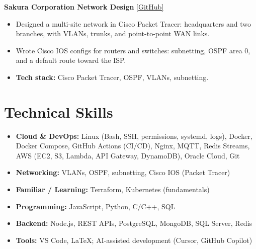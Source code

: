 \documentclass[a4paper,10.5pt]{article}
\begin{document}
\vspace{0.08cm}

\textbf{Sakura Corporation Network Design} \hfill
{\small \href{https://github.com/Muhammad-Ahmad17/sakura-corporation-network-design}{[GitHub]}}
\begin{itemize}[nosep, leftmargin=1.5em, topsep=2pt]
  \item Designed a multi-site network in Cisco Packet Tracer: headquarters and two branches, with VLANs, trunks, and point-to-point WAN links.
  \item Wrote Cisco IOS configs for routers and switches: subnetting, OSPF area 0, and a default route toward the ISP.
  \item \textbf{Tech stack:} Cisco Packet Tracer, OSPF, VLANs, subnetting.
\end{itemize}

\section{Technical Skills}

\begin{itemize}[nosep, leftmargin=1.5em, topsep=2pt]
  \item \textbf{Cloud \& DevOps:} Linux (Bash, SSH, permissions, systemd, logs), Docker, Docker Compose, GitHub Actions (CI/CD), Nginx, MQTT, Redis Streams, AWS (EC2, S3, Lambda, API Gateway, DynamoDB), Oracle Cloud, Git
  \item \textbf{Networking:} VLANs, OSPF, subnetting, Cisco IOS (Packet Tracer)
  \item \textbf{Familiar / Learning:} Terraform, Kubernetes (fundamentals)
  \item \textbf{Programming:} JavaScript, Python, C/C++, SQL
  \item \textbf{Backend:} Node.js, REST APIs, PostgreSQL, MongoDB, SQL Server, Redis
  \item \textbf{Tools:} VS Code, LaTeX; AI-assisted development (Cursor, GitHub Copilot)
\end{itemize}
\end{document}
